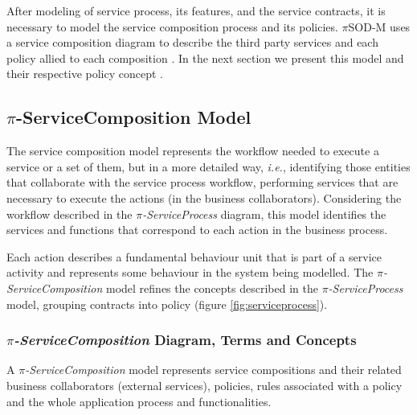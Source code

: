 \bigskip 
\bigskip

After modeling of service process, its features, and the
service contracts, it is necessary to model the service composition process and
its policies. $\pi$SOD-M uses a service composition diagram
to describe the third party services and each policy allied to
each composition . In the next section we present this model and their
respective policy concept .
 
\subsection{$\pi$-ServiceComposition Model}

The service composition model represents the workflow needed to execute a
service or a set of them, but in a more detailed way, \textit{i.e.}, identifying
those entities that collaborate with the service process workflow, performing
services that are necessary to execute the actions (in the business
collaborators). Considering the workflow described in the
\textit{$\pi$-ServiceProcess} diagram, this model identifies the services and
functions that correspond to each action in the business process.

Each action describes a fundamental behaviour unit that is part of a service
activity and represents some behaviour in the system being
modelled. The \textit{$\pi$-ServiceComposition} model refines the concepts
described in the \textit{$\pi$-ServiceProcess} model, grouping contracts
into policy (figure \ref{fig:serviceprocess}).



\subsubsection{\textit{$\pi$-ServiceComposition} Diagram, Terms and Concepts} 
  


%  
 A \textit{$\pi$-ServiceComposition} model represents service
 compositions and their related business collaborators (external services),
 policies, rules associated with a policy and the whole application
 process and functionalities. 
 
